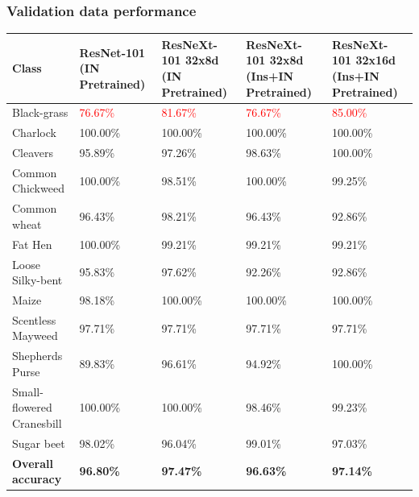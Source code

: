 \documentclass{beamer}
\begin{document}
\begin{frame}
	\frametitle{Validation data performance}
	
\begin{table}[h]
	\footnotesize
	\begin{center}
		\begin{tabular}{|p{3.4cm}|p{1.7cm}|p{1.7cm}|p{1.7cm}|p{1.7cm}|}
			\hline
			Class & ResNet-101 (IN Pretrained) & ResNeXt-101 32x8d (IN Pretrained) & ResNeXt-101 32x8d (Ins+IN Pretrained) & ResNeXt-101 32x16d (Ins+IN Pretrained)\\
			\hline\hline
			Black-grass &  \textcolor{red}{76.67\%} &\textcolor{red}{81.67\%}  & \textcolor{red}{76.67\%}  & \textcolor{red}{85.00\%}  \\
			Charlock & 100.00\% & 100.00\% & 100.00\% & 100.00\% \\
			Cleavers & 95.89\% & 97.26\% & 98.63\% & 100.00\%  \\
			Common Chickweed & 100.00\% & 98.51\% & 100.00\% & 99.25\%\\
			Common wheat & 96.43\%  & 98.21\% & 96.43\% & 92.86\%\\
			Fat Hen & 100.00\% & 99.21\% & 99.21\% & 99.21\% \\
			Loose Silky-bent & 95.83\% & 97.62\% & 92.26\% & 92.86\% \\
			Maize & 98.18\% & 100.00\% & 100.00\% & 100.00\% \\
			Scentless Mayweed & 97.71\% & 97.71\% & 97.71\% & 97.71\% \\
			Shepherds Purse & 89.83\% & 96.61\% & 94.92\% & 100.00\% \\
			Small-flowered Cranesbill & 100.00\% & 100.00\% & 98.46\% & 99.23\% \\
			Sugar beet & 98.02\% & 96.04\% & 99.01\% & 97.03\% \\
			\hline
			\textbf{Overall accuracy} & \textbf{96.80\%} & \textbf{97.47\%} & \textbf{96.63\%} & \textbf{97.14\%} \\
			\hline
		\end{tabular}
	\end{center}
	\label{table:val}
\end{table}

	
\end{frame}
\end{document}
